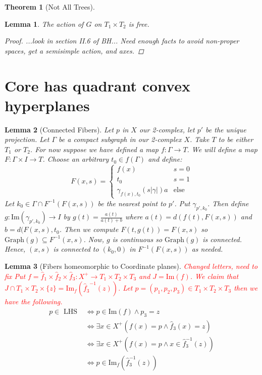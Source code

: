 \documentclass{article}
\theoremstyle{mystyle}
\newtheorem{thm}{Theorem}[section]
\newtheorem{lem}{Lemma}[section]
\theoremstyle{remark}
\begin{document}
\begin{thm}
    [Not All Trees]
\end{thm}

\begin{lem}
    The action of \(G\) on \(T_1 \times T_{2} \) is free.
    \begin{proof}
        ...look in section II.6 of BH... Need enough facts to avoid non-proper spaces, get a semisimple action, and axes.
    \end{proof}
\end{lem}

\section{Core has quadrant convex hyperplanes}

\begin{lem}
    [Connected Fibers]
    \label{lem:confib} 
    Let \(p\) in \(X\) our 2-complex, let \(p'\) be the unique projection. Let \(\Gamma\) be a compact subgraph in our 2-complex \(X\).  Take \(T\) to be either \(T_{1}\) or \(T_{2}\). For now suppose we have defined a map \(f: \Gamma \to T\). We will define a map \(F: \Gamma \times I \to T\). Choose an arbitrary \(t_{0} \in f(\Gamma) \) and define: 
    \[ F(x,s) = 
        \begin{cases} 
            f(x)& s=0\\ 
            t_{0} & s=1\\
            \gamma_{f(x),t_{0}} (s | \gamma |)a & \text{else}
        \end{cases}
    \]
    Let \(k_{0} \in \Gamma \cap F^{-1} (F(x,s))\) be the nearest point to \(p'\). Put \(\gamma_{p',k_{0}}\). Then define \(g: \text{Im} (\gamma_{p',k_{0}}) \to I\) by \(g(t) = \frac{a(t)}{a(t)+b}\) where \(a(t) = d(f(t), F(x,s))\) and \(b = d(F(x,s), t_{0}\). Then we compute \(F(t,g(t))=F(x,s)\) so \(\text{Graph}(g) \subseteq F^{-1} (x,s)\). Now, \(g\) is continuous so \(\text{Graph}(g)\) is connected. Hence, \((x,s)\) is connected to \((k_{0} ,0)\) in \(F^{-1} (F(x,s))\) as needed.
\end{lem}
\begin{lem}
    [Fibers homeomorphic to Coordinate planes]



    \textcolor{red}{Changed letters, need to fix
    Put \(f = \hat f_{1} \times \hat f_{2} \times \hat f_{3}: X^{+} \to T_{1} \times T_{2} \times T_{3} \) and \(J = \text{Im}(f)\). We claim that \(J \cap T_{1} \times T_{2} \times \{z\} = \text{Im}_{f} ({\hat f_{3}}^{-1}(z))\). Let \(p = (p_{1}, p_{2} , p_{3}) \in T_{1} \times T_{2} \times T_{3}\) then we have the following. }
    \begin{align*}
        p \in \text { LHS } & \Longleftrightarrow p \in \text{Im}(f) \wedge p_{3} = z \\ 
        & \Longleftrightarrow \exists x \in X^{+} (f(x)=p \wedge \hat f_3(x)=z)\\
        & \Longleftrightarrow \exists x \in X^{+} (f(x)=p \wedge x \in \hat f_3^{-1} (z))\\
        & \Longleftrightarrow p \in \text{Im}_f(\hat f_3^{-1} (z))
    \end{align*}
\end{lem}
\end{document}
